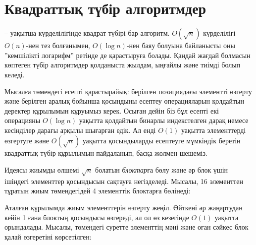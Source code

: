 \chapter{Квадраттық түбір алгоритмдер}


 -- уақытша күрделілігінде
квадрат түбірі бар алгоритм.  $O(\sqrt n)$ күрделілігі $O(n)$-нен
тез болғанымен, $O(\log n)$-нен баяу болуына байланысты оны ''кемшілікті логарифм'' 
ретінде де қарастыруға болады. Қандай жағдай болмасын көптеген түбір алгоритмдер қолданыста жылдам, ыңғайлы және тиімді болып келеді. 

Мысалға төмендегі есепті қарастырайық:
берілген позициядағы элементті өзгерту және
берілген аралық бойынша қосындыны есептеу
операцияларын қолдайтын деректер құрылымын құруымыз керек.
Осыған дейін біз бұл есепті
екі операцияны $O(\log n)$ уақытта қолдайтын
бинарлы индекстелген дарақ немесе кесінділер дарағы 
арқылы шығарған едік. Ал енді $O(1)$ уақытта
элементтерді өзгертуге және $O(\sqrt n)$ уақытта 
қосындыларды есептеуге мүмкіндік беретін квадраттық 
түбір құрылымын пайдаланып, басқа жолмен шешеміз.

Идеясы жиымды өлшемі $\sqrt n$ болатын \emph{блоктар}ға бөлу
және әр блок үшін ішіндегі элементтер қосындысын сақтауға негізделеді.
Мысалы, 16 элементтен тұратын жиым төмендегідей 4 элементтік блоктарға бөлінеді:

\begin{center}
\end{center}

Аталған құрылымда жиым элементтерін өзгерту 
жеңіл. Өйткені әр жаңартудан кейін 1 ғана блоктың
қосындысы өзгереді, ал ол өз кезегінде $O(1)$
уақытта орындалады. Мысалы, төмендегі суретте
элементтің мәні және оған сәйкес блок қалай
өзгеретіні көрсетілген:

